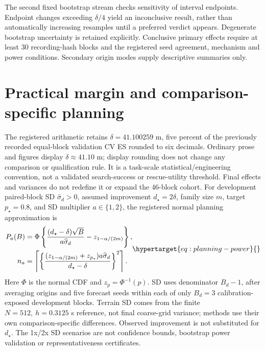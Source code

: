 The second fixed bootstrap stream checks sensitivity of interval endpoints.
Endpoint changes exceeding \(\delta/4\) yield an inconclusive result, rather
than automatically increasing resamples until a preferred verdict appears.
Degenerate bootstrap uncertainty is retained explicitly. Conclusive primary
effects require at least 30 recording-hash blocks and the registered seed
agreement, mechanism and power conditions. Secondary origin modes supply
descriptive summaries only.


\section{Practical margin and comparison-specific planning}
\label{sec:planning-qualification}\hypertarget{sec:planning-qualification}{}
The registered arithmetic retains \(\delta=41.100259\) m, five percent of
the previously recorded equal-block validation CV ES rounded to six
decimals. Ordinary prose and figures display \(\delta\approx41.10\) m;
display rounding does not change any comparison or qualification rule.
It is a task-scale
statistical/engineering convention, not a validated search-success or rescue-utility
threshold. Final effects and variances do not redefine it or expand the 46-block cohort.
For development paired-block SD \(\widehat\sigma_d>0\), assumed improvement
\(d_\star=2\delta\), family size \(m\), target \(p_\star=0.8\), and SD
multiplier \(a\in\{1,2\}\), the registered normal planning approximation is
\begin{equation}
\begin{aligned}
 P_a(B)&=\Phi\left\{\frac{(d_\star-\delta)\sqrt B}{a\widehat\sigma_d}
                         -z_{1-\alpha/(2m)}\right\},\\
 n_a&=\left\lceil\left\{\frac{(z_{1-\alpha/(2m)}+z_{p_\star})a\widehat\sigma_d}
                              {d_\star-\delta}\right\}^{2}\right\rceil .
\end{aligned}
\label{eq:planning-power}\hypertarget{eq:planning-power}{}
\end{equation}
Here \(\Phi\) is the normal CDF and \(z_p=\Phi^{-1}(p)\). SD uses denominator
\(B_d-1\), after averaging origins and five forecast seeds within each of only
\(B_d=3\) calibration-exposed development blocks. Terrain SD comes from the
finite \(N=512,\ h=0.3125\) s reference, not final coarse-grid variance;
methods use their own comparison-specific differences. Observed improvement
is not substituted for \(d_\star\). The 1x/2x SD scenarios are not confidence
bounds, bootstrap power validation or representativeness certificates.

